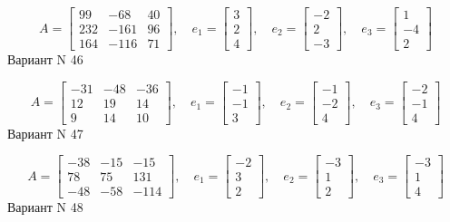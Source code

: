 \documentclass[11pt]{report}
\begin{document}
$$A = \left[\begin{matrix}99 & -68 & 40\\232 & -161 & 96\\164 & -116 & 71\end{matrix}\right],\quad e_1 = \left[\begin{matrix}3\\2\\4\end{matrix}\right],\quad e_2 = \left[\begin{matrix}-2\\2\\-3\end{matrix}\right],\quad e_3 = \left[\begin{matrix}1\\-4\\2\end{matrix}\right]$$Вариант N 46

$$A = \left[\begin{matrix}-31 & -48 & -36\\12 & 19 & 14\\9 & 14 & 10\end{matrix}\right],\quad e_1 = \left[\begin{matrix}-1\\-1\\3\end{matrix}\right],\quad e_2 = \left[\begin{matrix}-1\\-2\\4\end{matrix}\right],\quad e_3 = \left[\begin{matrix}-2\\-1\\4\end{matrix}\right]$$Вариант N 47

$$A = \left[\begin{matrix}-38 & -15 & -15\\78 & 75 & 131\\-48 & -58 & -114\end{matrix}\right],\quad e_1 = \left[\begin{matrix}-2\\3\\2\end{matrix}\right],\quad e_2 = \left[\begin{matrix}-3\\1\\2\end{matrix}\right],\quad e_3 = \left[\begin{matrix}-3\\1\\4\end{matrix}\right]$$Вариант N 48
\end{document}
